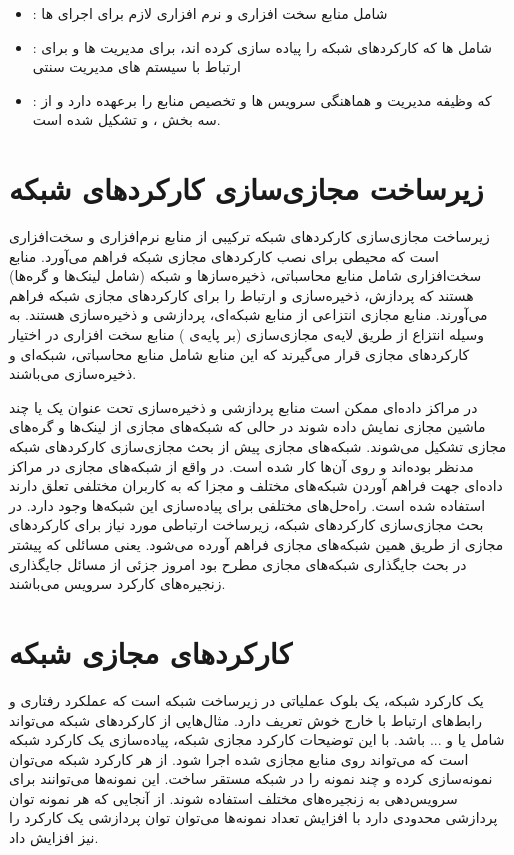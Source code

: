 \begin{itemize}
    \item
    : شامل منابع سخت افزاری و نرم افزاری لازم برای اجرای  ها
    \item
    : شامل  ها که کارکردهای شبکه را پیاده سازی کرده اند،  برای مدیریت  ها و  برای ارتباط با سیستم های مدیریت سنتی
    \item
    : که وظیفه مدیریت و هماهنگی سرویس ها و تخصیص منابع را برعهده دارد و از سه بخش ،  و  تشکیل شده است.
\end{itemize}

\section{زیرساخت مجازی‌سازی کارکردهای شبکه}
زیرساخت مجازی‌سازی کارکردهای شبکه ترکیبی از منابع نرم‌افزاری و سخت‌افزاری است
که محیطی برای نصب
کارکردهای مجازی شبکه فراهم می‌آورد.
منابع سخت‌افزاری شامل منابع محاسباتی،
ذخیره‌سازها و شبکه
(شامل لینک‌ها و گره‌ها)
هستند
که پردازش، ذخیره‌سازی و ارتباط را
برای کارکردهای مجازی شبکه فراهم می‌آورند.
منابع مجازی انتزاعی از منابع شبکه‌ای، پردازشی و ذخیر‌ه‌سازی هستند.
به وسیله انتزاع از طریق لایه‌ی مجازی‌سازی (بر پایه‌ی )
منابع سخت افزاری در اختیار کارکردهای مجازی
قرار می‌گیرند که این منابع شامل منابع محاسباتی، شبکه‌ای و ذخیره‌سازی می‌باشند.

در مراکز داده‌ای ممکن است منابع پردازشی و ذخیره‌سازی تحت عنوان یک یا چند
ماشین مجازی نمایش داده شوند در حالی که شبکه‌های مجازی از لینک‌ها و گره‌های مجازی تشکیل می‌شوند.
شبکه‌های مجازی پیش از بحث مجازی‌سازی کارکردهای شبکه مدنظر بوده‌اند و روی آن‌ها کار شده است.
در واقع از شبکه‌های مجازی در مراکز داده‌ای جهت فراهم آوردن شبکه‌های مختلف و مجزا که به کاربران مختلفی تعلق دارند
استفاده شده است. راه‌حل‌های مختلفی برای پیاده‌سازی این شبکه‌ها وجود دارد. در بحث مجازی‌سازی کارکردهای شبکه‌، زیرساخت ارتباطی
مورد نیاز 
برای کارکردهای مجازی از طریق همین شبکه‌های مجازی فراهم آورده می‌شود.
یعنی مسائلی که پیشتر در بحث جایگذاری شبکه‌های مجازی مطرح بود
امروز جزئی از مسائل جایگذاری زنجیره‌های کارکرد سرویس می‌باشند.

\section{کارکردهای مجازی شبکه}
یک کارکرد شبکه، یک بلوک عملیاتی در زیرساخت شبکه است که عملکرد رفتاری و رابط‌های ارتباط با خارج خوش تعریف دارد.
مثال‌هایی از کارکردهای شبکه می‌تواند شامل
یا
و ... باشد.
با این توضیحات کارکرد مجازی شبکه، پیاده‌سازی یک کارکرد شبکه است
که می‌تواند روی منابع مجازی شده اجرا شود.
از هر کارکرد شبکه می‌توان نمونه‌سازی کرده و چند نمونه را در شبکه مستقر ساخت. 
این نمونه‌ها می‌توانند برای سرویس‌دهی به زنجیره‌های مختلف استفاده شوند. از آنجایی که 
هر نمونه توان پردازشی محدودی دارد با افزایش تعداد نمونه‌ها می‌توان توان پردازشی یک کارکرد را نیز افزایش داد.

